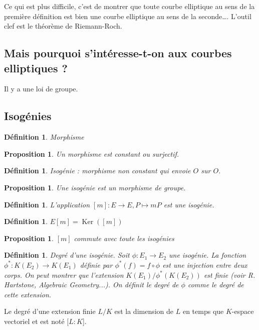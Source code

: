 \documentclass{article}
\theoremstyle{plain}%
\newtheorem{prop}[thm]{Proposition}
\newtheorem{deff}[thm]{Définition}
\theoremstyle{definition}%
\DeclareMathOperator{\Ker}{Ker}
\begin{document}
Ce qui est plus difficile, c'est de montrer que toute courbe elliptique au sens de la première définition est bien une courbe elliptique au sens de la seconde\ldots. L'outil clef est le théorème de Riemann-Roch.

\subsection{Mais pourquoi s'intéresse-t-on aux courbes elliptiques ?}

Il y a une loi de groupe.

\subsection{Isogénies}
\begin{deff}
  Morphisme 
\end{deff}

\begin{prop}
  Un morphisme est constant ou surjectif.
\end{prop}

\begin{deff}
  Isogénie : morphisme non constant qui envoie $O$ sur $O$.
\end{deff}

\begin{prop}
  Une isogénie est un morphisme de groupe.
\end{prop}

\begin{deff}
  L'application $[m] : E \to E, P \mapsto mP$ est une isogénie. 
\end{deff}

\begin{deff}
  $E[m] = \Ker([m])$
\end{deff}

\begin{prop}
  $[m]$ commute avec toute les isogénies
\end{prop}

\begin{deff}
  Degré d'une isogénie. Soit $\phi : E_1 \to E_2$ une isogénie. La fonction $\phi^* : K(E_2) \to K(E_1)$ définie par $\phi^*(f) = f \circ \phi$ est une injection entre deux corps. On peut montrer que l'extension $K(E_1)/\phi^*(K(E_2))$ est finie (voir R. Hartstone, Algebraic Geometry...). On définit le degré de $\phi$ comme le degré de cette extension.
\end{deff}

Le degré d'une extension finie $L/K$ est la dimension de $L$ en temps que $K$-espace vectoriel et est noté $[L : K$].
\end{document}
